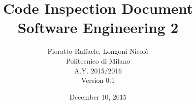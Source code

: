 \begin{figure}
  \centering
	\def\svgwidth{\columnwidth}
    \resizebox{0.35\textwidth}{!}{}
\end{figure}
\title{{\Huge \textbf{C}ode \textbf{I}nspection \textbf{D}ocument}\\{\Large Software Engineering 2}}

\author{Fioratto Raffaele, Longoni Nicol\`{o}
\\Politecnico di Milano
\\{\small A.Y. 2015/2016}
\\{\small Version 0.1}}
\date{December 10, 2015}
\maketitle
\newpage
\tableofcontents
\listoffigures
\lstlistoflistings